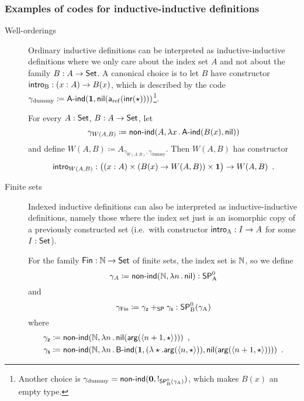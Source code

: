\documentclass{article}
\begin{document}
\subsubsection{Examples of codes for inductive-inductive definitions}

\begin{description}
\item[Well-orderings] Ordinary inductive definitions can be
  interpreted as inductive-inductive definitions where we only care
  about the index set $A$ and not about the family $B : A \to \mathsf{Set}$. A
  canonical choice is to let $B$ have constructor $\mathsf{intro}_{\mathrm{B}} : (x : A)
  \to B(x)$, which is described by the code $\gamma_{\text{dummy}}
  \coloneqq \mathsf{A}\text{-}\mathsf{ind}(\mathbf{1},
  \mathsf{nil}(\mathsf{a}_{\mathrm{ref}}(\mathsf{inr}(\star))))$\footnote{Another choice is
    $\gamma_{\text{dummy}} = \mathsf{non}\text{-}\mathsf{ind}(\mathbf{0}, !_{\mathsf{SP}^{0}_{\mathrm{B}}(\gamma_{\mathrm{A}})})$, which makes $B(x)$
    an empty type.}.

  For every $A : \mathsf{Set}$, $B : A \to \mathsf{Set}$, let
  \[
  \gamma_{W(A, B)} \coloneqq \mathsf{non}\text{-}\mathsf{ind}(A, \lambda x\,.\,\mathsf{A}\text{-}\mathsf{ind}(B(x),\mathsf{nil}))
  \]
  and define $W(A, B) \coloneqq A_{\gamma_{W(A, B)},
    \gamma_{\text{dummy}}}$.  Then $W(A, B)$ has constructor
  \[
  \mathsf{intro}_{W(A, B)} : \big((x : A) \times (B(x) \to W(A, B)) \times \mathbf{1}\big) \to W(A, B) \enspace .
  \]

\item[Finite sets] Indexed inductive definitions can also be
  interpreted as inductive-inductive definitions, namely those where
  the index set just is an isomorphic copy of a previously constructed
  set (i.e.\ with constructor $\mathsf{intro}_{\mathrm{A}} : I \to A$ for some $I : \mathsf{Set}$).

  For the family $\mathsf{Fin} : \mathbb{N} \to \mathsf{Set}$ of finite sets, the index set
  is $\mathbb{N}$, so we define
  \[
  \gamma_A \coloneqq \mathsf{non}\text{-}\mathsf{ind}(\mathbb{N}, \lambda n\,.\,\mathsf{nil}) : \mathsf{SP}^{0}_{\mathrm{A}}
  \]
  and
  \[
  \gamma_{\mathsf{Fin}} \coloneqq \gamma_{\mathsf{z}} +_{\mathsf{SP}} \gamma_{\mathsf{s}} : \mathsf{SP}^{0}_{\mathrm{B}}(\gamma_{\mathrm{A}})
  \]
  where
  \begin{align*}
    \gamma_{\mathsf{z}} &\coloneqq \mathsf{non}\text{-}\mathsf{ind}(\mathbb{N}, \lambda n\,.\,\mathsf{nil}(\mathsf{arg}(\langle n + 1 , \star\rangle))) \enspace ,\\
    \gamma_{\mathsf{s}} &\coloneqq \mathsf{non}\text{-}\mathsf{ind}(\mathbb{N}, \lambda n\,.\,\mathsf{B}\text{-}\mathsf{ind}(\mathbf{1}, (\lambda \star . \mathsf{arg}(\langle n , \star\rangle)), \mathsf{nil}(\mathsf{arg}(\langle n + 1 , \star\rangle)))) \enspace .
  \end{align*} 


\end{description}
\end{document}
